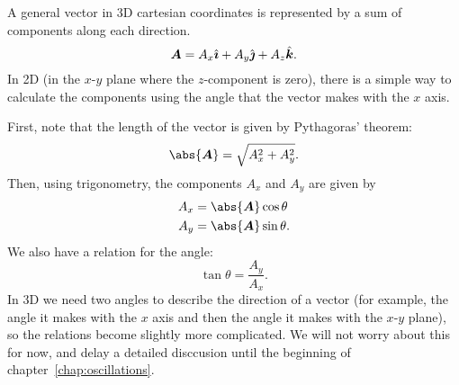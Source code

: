 \documentclass[../classical_mechanics.tex]{subfiles}
\begin{document}
        A general vector in 3D cartesian coordinates is represented by a sum of components along each direction.
        \begin{equation}
            \boldsymbol{A}=A_x\hat{\boldsymbol{\imath}}+A_y\hat{\boldsymbol{\jmath}}+A_z\hat{\boldsymbol{k}}.
        \end{equation}
        In 2D (in the $x$-$y$ plane where the $z$-component is zero), there is a simple way to calculate the components using the angle that the vector makes with the $x$ axis.
        \begin{figure}[H]
            \centering
        \end{figure}
        First, note that the length of the vector is given by Pythagoras' theorem:
        \begin{equation}\label{eq:2d-polar-length}
            \abs{\vec{A}}=\sqrt{A_x^2+A_y^2}.
        \end{equation}
        Then, using trigonometry, the components $A_x$ and $A_y$ are given by
        \begin{align}
            A_x&=\abs{\vec{A}}\cos\theta\label{eq:2d-polar-x-component}\\
            A_y&=\abs{\vec{A}}\sin\theta\label{eq:2d-polar-y-component}.
        \end{align}
        We also have a relation for the angle:
        \begin{equation}
            \tan\theta=\frac{A_y}{A_x}\label{eq:2d-polar-theta}.
        \end{equation}
        In 3D we need two angles to describe the direction of a vector (for example, the angle it makes with the $x$ axis and then the angle it makes with the $x$-$y$ plane), so the relations become slightly more complicated.
        We will not worry about this for now, and delay a detailed disccusion until the beginning of chapter~\ref{chap:oscillations}.
\end{document}
